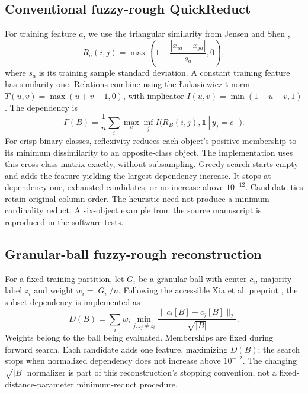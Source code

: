 \documentclass[11pt,a4paper]{article}
\begin{document}
\subsection{Conventional fuzzy-rough QuickReduct}
For training feature $a$, we use the triangular similarity from Jensen and Shen \cite{jensen},
\begin{equation}
 R_a(i,j)=\max\left(1-\frac{|x_{ia}-x_{ja}|}{s_a},0\right),
\end{equation}
where $s_a$ is its training sample standard deviation. A constant training feature has similarity one. Relations combine using the \L{}ukasiewicz t-norm $T(u,v)=\max(u+v-1,0)$, with implicator $I(u,v)=\min(1-u+v,1)$. The dependency is
\begin{equation}
 \Gamma(B)=\frac{1}{n}\sum_i\max_c\inf_j I\bigl(R_B(i,j),\mathbb{1}[y_j=c]\bigr).
\end{equation}
For crisp binary classes, reflexivity reduces each object's positive membership to its minimum dissimilarity to an opposite-class object. The implementation uses this cross-class matrix exactly, without subsampling. Greedy search starts empty and adds the feature yielding the largest dependency increase. It stops at dependency one, exhausted candidates, or no increase above $10^{-12}$. Candidate ties retain original column order. The heuristic need not produce a minimum-cardinality reduct. A six-object example from the source manuscript is reproduced in the software tests.

\subsection{Granular-ball fuzzy-rough reconstruction}
For a fixed training partition, let $G_i$ be a granular ball with center $c_i$, majority label $z_i$ and weight $w_i=|G_i|/n$. Following the accessible Xia et al. preprint \cite{xia}, the subset dependency is implemented as
\begin{equation}\label{eq:gb}
 D(B)=\sum_i w_i\min_{j:z_j\ne z_i}\frac{\|c_i[B]-c_j[B]\|_2}{\sqrt{|B|}}.
\end{equation}
Weights belong to the ball being evaluated. Memberships are fixed during forward search. Each candidate adds one feature, maximizing $D(B)$; the search stops when normalized dependency does not increase above $10^{-12}$. The changing $\sqrt{|B|}$ normalizer is part of this reconstruction's stopping convention, not a fixed-distance-parameter minimum-reduct procedure.
\end{document}
